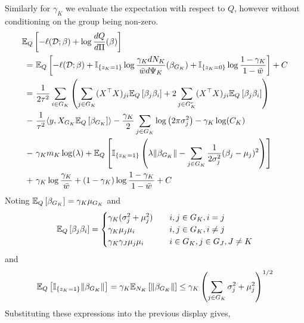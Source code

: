 \documentclass[12pt]{article}
\begin{document}
Similarly for $\gamma_K$ we evaluate the expectation with respect to $Q$, however without conditioning on the group being non-zero.
{\allowdisplaybreaks
\begin{align}
    \mathbb{E}_{Q} & \left[ 
	- \ell(\mathcal{D}; \beta) + \log \frac{dQ}{d\Pi}(\beta) 
    \right]  \nonumber \\
= &\
    \mathbb{E}_{Q} \left[ 
	- \ell(\mathcal{D}; \beta) 
	+ \mathbb{I}_{\{z_K = 1\}} \log \frac{\gamma_K dN_K}{\bar{w} d\Psi_K}(\beta_{G_K}) 
	+ \mathbb{I}_{\{z_K = 0\}} \log \frac{1 - \gamma_K}{1 - \bar{w}}
    \right] + C \nonumber \\
=&\
    \frac{1}{2\tau^2} 
    \sum_{i \in G_K} \left( 
	\sum_{j \in G_K} (X^\top X)_{ji} 
	    \mathbb{E}_{Q} \left[ \beta_j \beta_i \right] 
	+ 
	2 \sum_{j \in G_K^c} (X^\top X)_{ji} 
	    \mathbb{E}_{Q} \left[ \beta_j \beta_i \right] 
    \right ) \nonumber \\
- &\
    \frac{1}{\tau^2} \langle y, X_{G_K} \mathbb{E}_Q\left[\beta_{G_K} \right] \rangle 
-
    \frac{\gamma_K}{2} \sum_{j \in G_K} \log \left( 2 \pi \sigma_j^2 \right)
-
    \gamma_K \log(C_K )
    \nonumber \\
- &\
    \gamma_K m_K \log (\lambda) 
+ 
    \mathbb{E}_{Q} \left[ 
	\mathbb{I}_{\{z_K=1\}} \left(
	\lambda \| \beta_{G_K} \|
	- \sum_{j \in G_K}
	    \frac{1}{2\sigma_j^2} (\beta_{j} - \mu_j)^2
	\right)
    \right]  \nonumber \\ 
+ &\
    \gamma_K \log \frac{\gamma_K}{\bar{w}}
    + (1 - \gamma_K) \log \frac{1 - \gamma_K}{1 - \bar{w}}
+ C \nonumber
\end{align}
}
Noting $\mathbb{E}_Q \left[ \beta_{G_K} \right] = \gamma_K \mu_{G_K} $ and
\begin{equation}
    \mathbb{E}_{Q} \left[ \beta_j \beta_i \right] = \begin{cases}
	\gamma_K (\sigma_{j}^2 + \mu_{j}^2) 	& \quad i,j \in G_K, i=j \\
	\gamma_K \mu_{j}\mu_{i} 		& \quad i,j \in G_K, i \neq j \\
	\gamma_K \gamma_J \mu_{j}\mu_{i} 	& \quad i \in G_K, j \in G_J, J \neq K
    \end{cases}
\end{equation}
and
\begin{equation}
    \mathbb{E}_Q \left[ \mathbb{I}_{\{z_K = 1\}} \| \beta_{G_K} \| \right] = 
    \gamma_K \mathbb{E}_{N_K} \left[ \| \beta_{G_K} \| \right]
    \leq \gamma_K \left( \sum_{j \in G_K} \sigma^2_j + \mu^2_j \right)^{1/2}
\end{equation}
Substituting these expressions into the previous display gives,
\end{document}
